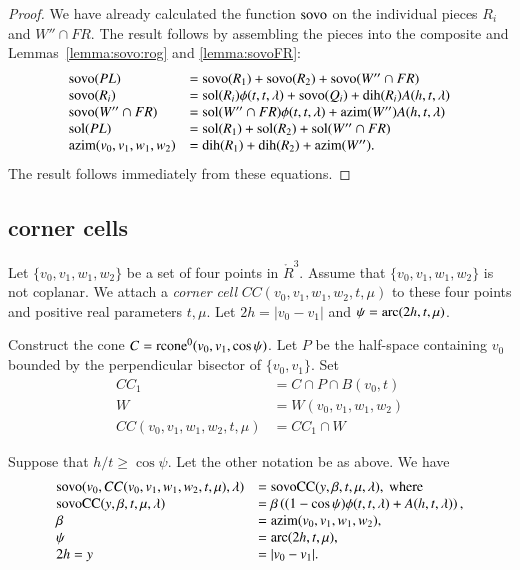 \begin{proof} We have already calculated the function ${\operatorname{sovo}}$
on the individual pieces $R_i$ and $W''\cap FR$.  The result
follows by assembling the pieces into the composite and 
Lemmas~\ref{lemma:sovo:rog} and \ref{lemma:sovoFR}:
  $$
  \begin{array}{lll}
  {\operatorname{sovo}}(PL) &= {\operatorname{sovo}}(R_1) + {\operatorname{sovo}}(R_2) + {\operatorname{sovo}}(W''\cap FR) \\
  {\operatorname{sovo}}(R_i) &= {\operatorname{sol}}(R_i) \phi(t,t,\lambda) +{\operatorname{sovo}}(Q_i)
   + \operatorname{dih}(R_i) A(h,t,\lambda)\\
  {\operatorname{sovo}}(W''\cap FR) &= {\operatorname{sol}}(W''\cap FR)\phi(t,t,\lambda) +
   {\operatorname{azim}}(W'') A(h,t,\lambda)\\
  \operatorname{sol}(PL) &=\operatorname{sol}(R_1)+\operatorname{sol}(R_2)+\operatorname{sol}(W''\cap FR)\\
  {\operatorname{azim}}(v_0,v_1,w_1,w_2) &= \operatorname{dih}(R_1)+\operatorname{dih}(R_2)+{\operatorname{azim}}(W'').
  \end{array}
  $$
The result follows immediately from these equations.
\end{proof}



\subsection{corner cells}

Let $\{v_0,v_1,w_1,w_2\}$ be a set of four points in $\ring{R}^3$.  
Assume that $\{v_0,v_1,w_1,w_2\}$ is not coplanar.
We
attach a {\it corner cell} $CC(v_0,v_1,w_1,w_2,t,\mu)$
to these four points and positive
real parameters $t,\mu$.  Let $2h=|v_0-v_1|$
and $\psi=\operatorname{arc}(2h,t,\mu)$.

Construct the cone $C={\operatorname{rcone}}^0(v_0,v_1,\cos\psi)$.
Let $P$ be the half-space containing $v_0$ bounded by
the perpendicular bisector of  $\{v_0,v_1\}$.  Set
$$
  \begin{array}{lll}
  CC_1 &= C\cap P \cap B(v_0,t)\\
  W &=W(v_0,v_1,w_1,w_2) \\
  CC(v_0,v_1,w_1,w_2,t,\mu) &= CC_1 \cap W
  \end{array}
$$

\begin{lemma} 
Suppose that $h/t \ge \cos\psi$.  Let the other notation
be as above.   We have
  $$
  \begin{array}{lll}
  {\operatorname{sovo}}(v_0,CC(v_0,v_1,w_1,w_2,t,\mu),\lambda)&=
  {\operatorname{sovoCC}}(y,\beta,t,\mu,\lambda), \text{ where } \\
  {\operatorname{sovoCC}}(y,\beta,t,\mu,\lambda) &= 
         \beta \left((1-\cos\psi)\phi(t,t,\lambda)+
    A(h,t,\lambda)\right),\\
    \beta &= {\operatorname{azim}}(v_0,v_1,w_1,w_2),\\
    \psi &= \operatorname{arc}(2h,t,\mu),\\
     2h=y &= |v_0-v_1|.
  \end{array}
  $$
\end{lemma}

